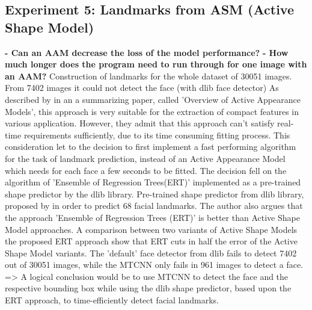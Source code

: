 \subsection{Experiment 5: Landmarks from ASM (Active Shape Model)}
\textbf{- Can an AAM decrease the loss of the model performance?}
\newline\newline
\textbf{- How much longer does the program need to run through for one image with an AAM?}
\newline\newline
Construction of landmarks for the whole dataset of 30051 images. From 7402 images it could not detect the face (with dlib face detector)
\newline\newline
As described by \citet{Gao:2010:ActiveAppearanceModels} in an a summarizing paper, called 'Overview of Active Appearance Models', this approach is very suitable for the extraction of compact features in various application. However, they admit that this approach can't satisfy real-time requirements sufficiently, due to its time consuming fitting process.
\newline\newline
This consideration let to the decision to first implement a fast performing algorithm for the task of landmark prediction, instead of an Active Appearance Model which needs for each face a few seconds to be fitted. The decision fell on the algorithm of 'Ensemble of Regression Trees(ERT)' \citep{Kazemi:2014:ShapePredictor} implemented as a pre-trained shape predictor by the dlib library.
\newline\newline
Pre-trained shape predictor from dlib library, proposed by \citet{Kazemi:2014:ShapePredictor} in order to predict 68 facial landmarks. The author also argues that the approach 'Ensemble of Regression Trees (ERT)' is better than Active Shape Model approaches. A comparison between two variants of Active Shape Models the proposed ERT approach show that ERT cuts in half the error of the Active Shape Model variants.
\newline\newline
The 'default' face detector from dlib fails to detect 7402 out of 30051 images, while the MTCNN only fails in 961 images to detect a face. => A logical conclusion would be to use MTCNN to detect the face and the respective bounding box while using the dlib shape predictor, based upon the ERT approach, to time-efficiently detect  facial landmarks.
\newline\newline
